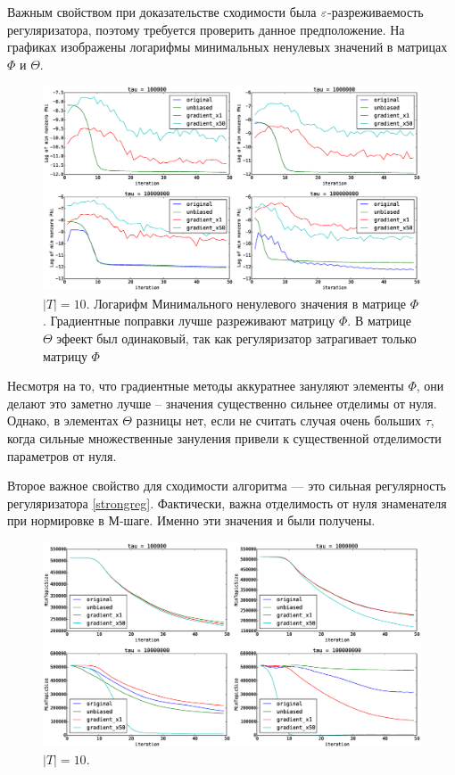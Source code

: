 \documentclass[12pt, twoside]{article}
\begin{document}
Важным свойством при доказательстве сходимости была $\varepsilon$-разреживаемость регуляризатора, поэтому требуется проверить данное предположение. На графиках изображены логарифмы минимальных ненулевых значений в матрицах $\Phi$ и $\Theta$.
\begin{figure}[!ht]
	\centering
	\includegraphics[width=1.0\linewidth]{paper_pictures/topics_10_minPhi_values}
	\caption{$|T| = 10$. Логарифм Минимального ненулевого значения в матрице $\Phi$. Градиентные поправки лучше разреживают матрицу $\Phi$. В матрице $\Theta$ эфеект был одинаковый, так как регуляризатор затрагивает только матрицу $\Phi$}    
\end{figure}
Несмотря на то, что градиентные методы аккуратнее  зануляют элементы $\Phi$, они делают это заметно лучше -- значения существенно сильнее отделимы от нуля. Однако, в элементах $\Theta$ разницы нет, если не считать случая очень больших $\tau$, когда сильные множественные зануления привели к существенной отделимости параметров от нуля.

Второе важное свойство для сходимости алгоритма --- это сильная регулярность регуляризатора \ref{strongreg}. Фактически, важна отделимость от нуля знаменателя при нормировке в М-шаге. Именно эти значения  и были получены.

\begin{figure}[!ht]
	\centering
	\caption{$|T| = 10$.}    
	\includegraphics[width=1.0\linewidth]{paper_pictures/topics_10_MinTopicSize}
\end{figure}
\end{document}
